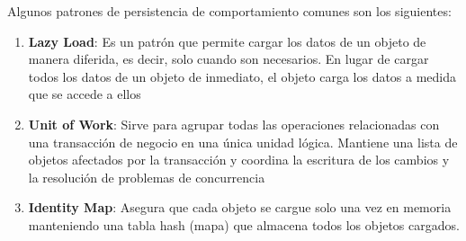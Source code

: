 \documentclass{article}
\begin{document}
		Algunos patrones de persistencia de comportamiento comunes son los siguientes:
		
			\begin{enumerate}
			\item {\textbf{Lazy Load}}: Es un patrón que permite cargar los datos de un objeto de manera diferida, es decir, solo cuando son necesarios. En lugar de cargar todos los datos de un objeto de inmediato, el objeto carga los datos a medida que se accede a ellos
			
			\item {\textbf{Unit of Work}}: Sirve para agrupar todas las operaciones relacionadas con una transacción de negocio en una única unidad lógica. Mantiene una lista de objetos afectados por la transacción y coordina la escritura de los cambios y la resolución de problemas de concurrencia
			
			
			\item {\textbf{Identity Map}}: Asegura que cada objeto se cargue solo una vez en memoria manteniendo una tabla hash (mapa) que almacena todos los objetos cargados.
			
		\end{enumerate}
		
		
\end{document}
